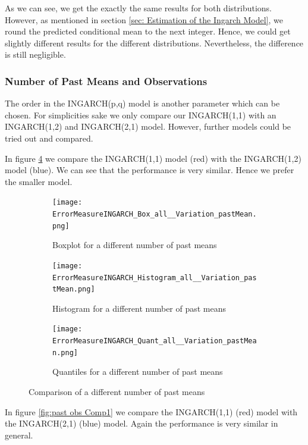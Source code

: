 As we can see, we get the exactly the same results for both distributions. However, as mentioned in section \ref{sec: Estimation of the Ingarch Model}, we round the predicted conditional mean to the next integer. Hence, we could get slightly different results for the different distributions. Nevertheless, the difference is still negligible. %


\subsubsection{Number of Past Means and Observations}
\label{sec: Number of Past Means and Observations}

The order in the INGARCH(p,q) model is another parameter which can be chosen. For simplicities sake we only compare our INGARCH(1,1) with an INGARCH(1,2) and INGARCH(2,1) model. However, further models could be tried out and compared. 

In figure \ref{fig:past means Comp1} we compare the INGARCH(1,1) model (red) with the INGARCH(1,2) model (blue). We can see that the performance is very similar. Hence we prefer the smaller model. 
\begin{figure}[htb!]
\centering
\begin{subfigure}[b]{0.45\textwidth}
\texttt{[image: ErrorMeasureINGARCH\_Box\_all\_\_Variation\_pastMean.png]}
\caption{Boxplot for a different number of past means}
\label{fig:past means Box}
\end{subfigure}
\hfill
\begin{subfigure}[b]{0.45\textwidth}
\texttt{[image: ErrorMeasureINGARCH\_Histogram\_all\_\_Variation\_pastMean.png]}
\caption{Histogram for a different number of past means}
\label{fig:past means Hist}
\end{subfigure}
\hfill
\begin{subfigure}[b]{0.8\textwidth}
\texttt{[image: ErrorMeasureINGARCH\_Quant\_all\_\_Variation\_pastMean.png]}
\caption{Quantiles for a different number of past means}
\label{fig:past means Quant}
\end{subfigure}
\caption{Comparison of a different number of past means}
\label{fig:past means Comp1}
\end{figure}


In figure \ref{fig:past obs Comp1} we compare the INGARCH(1,1) (red) model with the INGARCH(2,1) (blue) model. Again the performance is very similar in general. 

